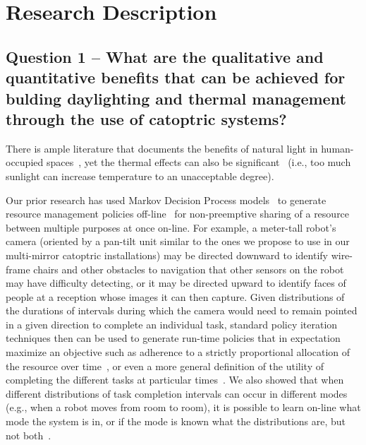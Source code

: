\section{Research Description}
\label{sec:research}

\subsection{Question 1 -- What are the qualitative and quantitative benefits
that can be achieved for bulding daylighting and thermal management
through the use of catoptric systems?}

There is ample literature that documents the benefits of natural light in
human-occupied spaces~\cite{Leslie03,ll01,pce00}, yet the thermal effects
can also be significant~\cite{bmbc13} (i.e., too much sunlight can
increase temperature to an unacceptable degree).



Our prior research has used Markov Decision Process
models~\cite{gtsg08} to generate resource management policies
off-line~\cite{gtgs09} for non-preemptive sharing of a resource
between multiple purposes at once on-line.  For example, a meter-tall robot's
camera (oriented by a pan-tilt unit similar to the ones we propose to
use in our multi-mirror catoptric installations) may be directed
downward to identify wire-frame chairs and other obstacles to
navigation that other sensors on the robot may have difficulty
detecting, or it may be directed upward to identify faces of people at
a reception whose images it can then capture. Given distributions of
the durations of intervals during which the camera would need to
remain pointed in a given direction to complete an individual task,
standard policy iteration techniques then can be used to generate
run-time policies that in expectation maximize an objective such as
adherence to a strictly proportional allocation of the resource over
time~\cite{gtsg08}, or even a more general definition of the utility 
of completing the different tasks at particular times~\cite{tggs10}.
We also showed that when different distributions of task completion
intervals can occur in different modes (e.g., when a robot moves
from room to room), it is possible to learn on-line what mode
the system is in, or if the mode is known what the distributions are,
but not both~\cite{gtgsuai10}.

